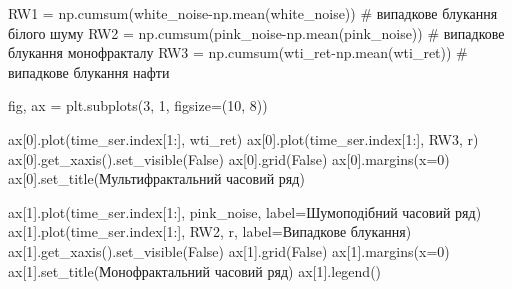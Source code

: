 \documentclass[
  letterpaper,
]{report}
\newenvironment{Shaded}{\begin{snugshade}}{\end{snugshade}}
\newcommand{\CommentTok}[1]{\textcolor[rgb]{0.37,0.37,0.37}{#1}}
\newcommand{\DecValTok}[1]{\textcolor[rgb]{0.68,0.00,0.00}{#1}}
\newcommand{\NormalTok}[1]{\textcolor[rgb]{0.00,0.23,0.31}{#1}}
\newcommand{\OperatorTok}[1]{\textcolor[rgb]{0.37,0.37,0.37}{#1}}
\newcommand{\StringTok}[1]{\textcolor[rgb]{0.13,0.47,0.30}{#1}}
\newcommand{\VariableTok}[1]{\textcolor[rgb]{0.07,0.07,0.07}{#1}}
\begin{document}
\begin{Shaded}
\begin{Highlighting}[]
\NormalTok{RW1 }\OperatorTok{=}\NormalTok{ np.cumsum(white\_noise}\OperatorTok{{-}}\NormalTok{np.mean(white\_noise)) }\CommentTok{\# випадкове блукання білого шуму}
\NormalTok{RW2 }\OperatorTok{=}\NormalTok{ np.cumsum(pink\_noise}\OperatorTok{{-}}\NormalTok{np.mean(pink\_noise))   }\CommentTok{\# випадкове блукання монофракталу}
\NormalTok{RW3 }\OperatorTok{=}\NormalTok{ np.cumsum(wti\_ret}\OperatorTok{{-}}\NormalTok{np.mean(wti\_ret))         }\CommentTok{\# випадкове блукання нафти}
\end{Highlighting}
\end{Shaded}

\begin{Shaded}
\begin{Highlighting}[]
\NormalTok{fig, ax }\OperatorTok{=}\NormalTok{ plt.subplots(}\DecValTok{3}\NormalTok{, }\DecValTok{1}\NormalTok{, figsize}\OperatorTok{=}\NormalTok{(}\DecValTok{10}\NormalTok{, }\DecValTok{8}\NormalTok{))}

\NormalTok{ax[}\DecValTok{0}\NormalTok{].plot(time\_ser.index[}\DecValTok{1}\NormalTok{:], wti\_ret)}
\NormalTok{ax[}\DecValTok{0}\NormalTok{].plot(time\_ser.index[}\DecValTok{1}\NormalTok{:], RW3, }\StringTok{\textquotesingle{}r\textquotesingle{}}\NormalTok{)}
\NormalTok{ax[}\DecValTok{0}\NormalTok{].get\_xaxis().set\_visible(}\VariableTok{False}\NormalTok{)}
\NormalTok{ax[}\DecValTok{0}\NormalTok{].grid(}\VariableTok{False}\NormalTok{)}
\NormalTok{ax[}\DecValTok{0}\NormalTok{].margins(x}\OperatorTok{=}\DecValTok{0}\NormalTok{)}
\NormalTok{ax[}\DecValTok{0}\NormalTok{].set\_title(}\StringTok{\textquotesingle{}Мультифрактальний часовий ряд\textquotesingle{}}\NormalTok{)}

\NormalTok{ax[}\DecValTok{1}\NormalTok{].plot(time\_ser.index[}\DecValTok{1}\NormalTok{:], pink\_noise, label}\OperatorTok{=}\StringTok{\textquotesingle{}Шумоподібний часовий ряд\textquotesingle{}}\NormalTok{)}
\NormalTok{ax[}\DecValTok{1}\NormalTok{].plot(time\_ser.index[}\DecValTok{1}\NormalTok{:], RW2, }\StringTok{\textquotesingle{}r\textquotesingle{}}\NormalTok{, label}\OperatorTok{=}\StringTok{\textquotesingle{}Випадкове блукання\textquotesingle{}}\NormalTok{)}
\NormalTok{ax[}\DecValTok{1}\NormalTok{].get\_xaxis().set\_visible(}\VariableTok{False}\NormalTok{)}
\NormalTok{ax[}\DecValTok{1}\NormalTok{].grid(}\VariableTok{False}\NormalTok{)}
\NormalTok{ax[}\DecValTok{1}\NormalTok{].margins(x}\OperatorTok{=}\DecValTok{0}\NormalTok{)}
\NormalTok{ax[}\DecValTok{1}\NormalTok{].set\_title(}\StringTok{\textquotesingle{}Монофрактальний часовий ряд\textquotesingle{}}\NormalTok{)}
\NormalTok{ax[}\DecValTok{1}\NormalTok{].legend()}


\end{Highlighting}
\end{Shaded}
\end{document}
